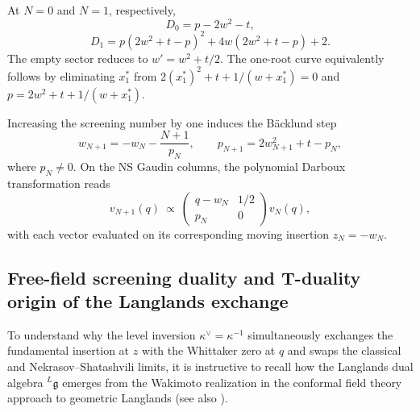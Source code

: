 \documentclass[a4paper,11pt]{article}
\numberwithin{equation}{section}
\begin{document}
At $N=0$ and $N=1$, respectively,
\begin{equation}
	\label{equation:PII Langlands empty invariant curve}
	D_{0}=p-2w^{2}-t,
\end{equation}
\begin{equation}
	\label{equation:PII Langlands one root invariant curve}
	D_{1}=p(2w^{2}+t-p)^{2}+4w(2w^{2}+t-p)+2.
\end{equation}
The empty sector reduces to $w'=w^{2}+t/2$.
The one-root curve equivalently follows by eliminating $x_{1}^*$ from
$2(x_{1}^*)^{2}+t+1/(w+x_{1}^*)=0$ and
$p=2w^{2}+t+1/(w+x_{1}^*)$.

Increasing the screening number by one induces the B\"acklund step
\begin{equation}
	\label{equation:PII Langlands screening Backlund shift}
	w_{N+1}=-w_{N}-\frac{N+1}{p_{N}},\qquad
	p_{N+1}=2w_{N+1}^{2}+t-p_{N},
\end{equation}
where $p_{N}\ne0$.  On the NS Gaudin columns, the polynomial
Darboux transformation reads
\begin{equation}
	\label{equation:PII Langlands polynomial Darboux shift}
	v_{N+1}(q)\ \propto\
	\begin{pmatrix}q-w_{N}&1/2\\p_{N}&0\end{pmatrix}v_{N}(q),
\end{equation}
with each vector evaluated on its corresponding moving insertion
$z_{N}=-w_{N}$.

\subsection{Free-field screening duality and T-duality origin of the Langlands exchange}
\label{sec:hecke-separation-langlands}

To understand why the level inversion $\kappa^{\vee}=\kappa^{-1}$ simultaneously exchanges the fundamental insertion at $z$ with the Whittaker zero at $q$ and swaps the classical and Nekrasov--Shatashvili limits, it is instructive to recall how the Langlands dual algebra ${}^{L}\mathfrak{g}$ emerges from the Wakimoto realization in the conformal field theory approach to geometric Langlands \cite[Sections~8.5--8.6]{Frenkel2005LanglandsLectures} (see also \cite{FeiginFrenkel1992,Frenkel2005Wakimoto}).
\end{document}
